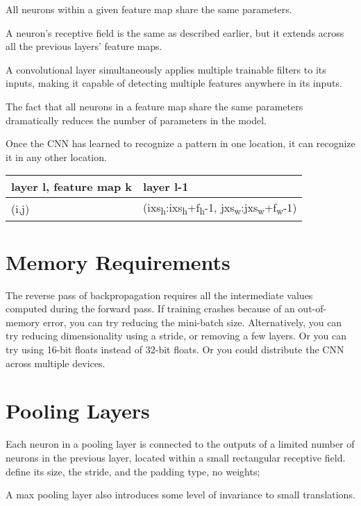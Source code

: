 \documentclass[11pt]{article}
\begin{document}
All neurons within a given feature map share the same parameters. 

A neuron’s receptive field is the same as described earlier, but it extends
across all the previous layers’ feature maps. 

A convolutional layer simultaneously applies multiple trainable
filters to its inputs, making it capable of detecting multiple features anywhere
in its inputs.

The fact that all neurons in a feature map share the same parameters dramatically
reduces the number of parameters in the model. 

Once the CNN has learned to recognize a pattern in one location, it can
recognize it in any other location.

\begin{center}
\begin{tabular}{ll}
\hline
layer l, feature map k & layer l-1\\
\hline
(i,j) & (ixs\textsubscript{h}:ixs\textsubscript{h}+f\textsubscript{h}-1, jxs\textsubscript{w}:jxs\textsubscript{w}+f\textsubscript{w}-1)\\
\hline
\end{tabular}
\end{center}

\section{Memory Requirements}
\label{sec:org3c3eba9}
The reverse pass of backpropagation requires all the intermediate values
computed during the forward pass.
If training crashes because of an out-of-memory error, you can try reducing the
mini-batch size. 
Alternatively, you can try reducing dimensionality using a stride, 
or removing a few layers. 
Or you can try using 16-bit floats instead of 32-bit floats. 
Or you could distribute the CNN across multiple devices.

\section{Pooling Layers}
\label{sec:orgc54031c}
Each neuron in a pooling layer is
connected to the outputs of a limited number of neurons in the previous
layer, located within a small rectangular receptive field. 
define its size, the stride, and the padding type, no weights; 

A max pooling layer also introduces some level of invariance
to small translations. 
\end{document}
